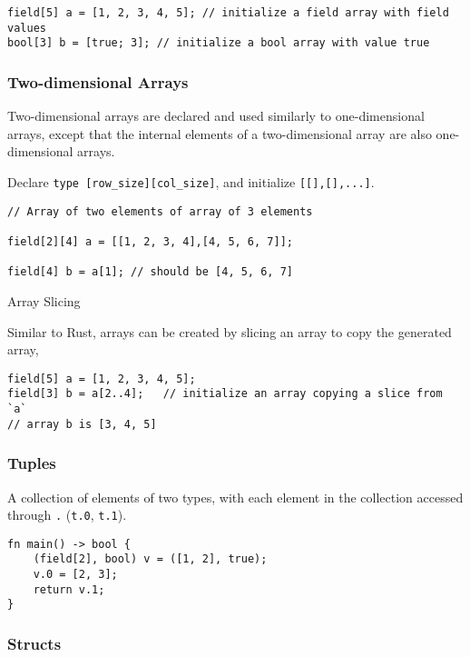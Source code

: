 \begin{lstlisting}
field[5] a = [1, 2, 3, 4, 5]; // initialize a field array with field values
bool[3] b = [true; 3]; // initialize a bool array with value true
\end{lstlisting}

\subsubsection*{Two-dimensional Arrays}

Two-dimensional arrays are declared and used similarly to one-dimensional arrays, except that the internal elements of a two-dimensional array are also one-dimensional arrays. 

Declare \texttt{type [row\_size][col\_size]}, and initialize \texttt{[[],[],...]}.

\begin{lstlisting}
// Array of two elements of array of 3 elements

field[2][4] a = [[1, 2, 3, 4],[4, 5, 6, 7]];

field[4] b = a[1]; // should be [4, 5, 6, 7]
\end{lstlisting}

Array Slicing

Similar to Rust, arrays can be created by slicing an array to copy the generated array,

\begin{lstlisting}
field[5] a = [1, 2, 3, 4, 5];
field[3] b = a[2..4];   // initialize an array copying a slice from `a`
// array b is [3, 4, 5]
\end{lstlisting}

\subsubsection*{Tuples}

A collection of elements of two types, with each element in the collection accessed through \texttt{.} (\texttt{t.0}, \texttt{t.1}).

\begin{lstlisting}
fn main() -> bool {
    (field[2], bool) v = ([1, 2], true);
    v.0 = [2, 3];
    return v.1;
}
\end{lstlisting}

\subsubsection*{Structs}

